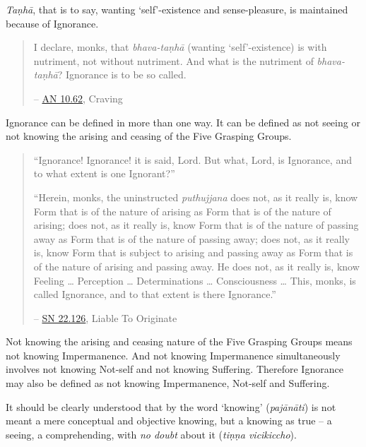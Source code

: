\textit{Taṇhā}, that is to say, wanting `self'-existence and sense-pleasure, is maintained because of Ignorance.

\begin{quote}
I declare, monks, that \textit{bhava-taṇhā} (wanting `self'-existence) is with nutriment, not without nutriment. And what is the nutriment of \textit{bhava-taṇhā}? Ignorance is to be so called.

 -- \href{https://suttacentral.net/an10.62/en/bodhi}{AN 10.62}, Craving
\end{quote}

Ignorance can be defined in more than one way. It can be defined as not seeing or not knowing the arising and ceasing of the Five Grasping Groups.

\begin{quote}
``Ignorance! Ignorance! it is said, Lord. But what, Lord, is Ignorance, and to what extent is one Ignorant?''

``Herein, monks, the uninstructed \textit{puthujjana} does not, as it really is, know Form that is of the nature of arising as Form that is of the nature of arising; does not, as it really is, know Form that is of the nature of passing away as Form that is of the nature of passing away; does not, as it really is, know Form that is subject to arising and passing away as Form that is of the nature of arising and passing away. He does not, as it really is, know Feeling \ldots\hspace{0pt} Perception \ldots\hspace{0pt} Determinations \ldots\hspace{0pt} Consciousness \ldots\hspace{0pt} This, monks, is called Ignorance, and to that extent is there Ignorance.''

 -- \href{https://suttacentral.net/sn22.126/en/sujato}{SN 22.126}, Liable To Originate
\end{quote}

Not knowing the arising and ceasing nature of the Five Grasping Groups means not knowing Impermanence. And not knowing Impermanence simultaneously involves not knowing Not-self and not knowing Suffering. Therefore Ignorance may also be defined as not knowing Impermanence, Not-self and Suffering.

It should be clearly understood that by the word `knowing' (\textit{pajānāti}) is not meant a mere conceptual and objective knowing, but a knowing as true -- a seeing, a comprehending, with \emph{no doubt} about it (\textit{tiṇṇa vicikiccho}).

